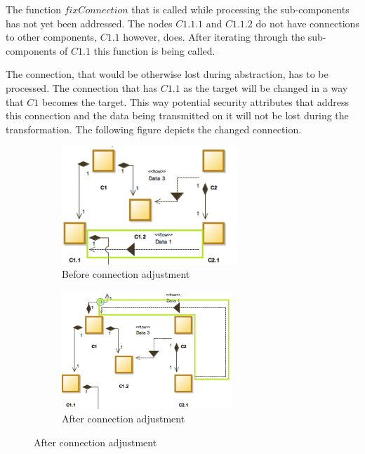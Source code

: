 The function $fixConnection$ that is called while processing the sub-components has not yet been addressed. The nodes $C1.1.1$ and $C1.1.2$ do not have connections to other components, $C1.1$ however, does. After iterating through the sub-components of $C1.1$ this function is being called. 

The connection, that would be otherwise lost during abstraction, has to be processed. The connection that has $C1.1$ as the target will be changed in a way that $C1$ becomes the target. This way potential security attributes that address this connection and the data being transmitted on it will not be lost during the transformation. The following figure depicts the changed connection.

\begin{figure}[H]
\centering
\begin{subfigure}{.5\textwidth}
  \centering
\includegraphics[width=0.73\textwidth]{pictures/initial}
\caption{Before connection adjustment}
\label{fig:con_c1.1}
\end{subfigure}%
\begin{subfigure}{.5\textwidth}
  \centering
\includegraphics[width=0.7\textwidth]{pictures/con_c11}
\caption{After connection adjustment}
\label{fig:con_c1.1}
\end{subfigure}
\label{fig:test}
\end{figure}

